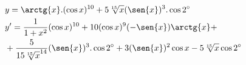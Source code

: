 \begin{ex}
\begin{align}
&y= \arctg{x}.(\cos{x})^{10}+5\sqrt[15]{x}(\sen{x})^3.\cos{2^\circ}\nonumber\\
&y'= \frac{1}{1+x^2}(\cos{x})^{10}+10(\cos{x})^9(-\sen{x})\arctg{x}+\nonumber\\
&+\frac{5}{15\sqrt[15]{x}^{14}}(\sen{x})^3.\cos{2^\circ}+3(\sen{x})^2\cos{x}-5\sqrt[15]{x}\cos{2^\circ}\nonumber
\end{align}
\end{ex}